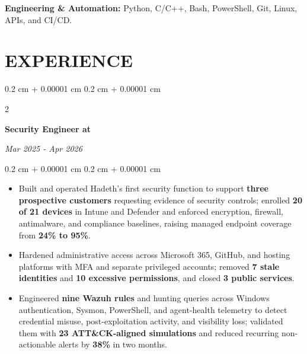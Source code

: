 \documentclass[11pt, letterpaper]{article}
\newenvironment{highlights}{
    \begin{itemize}[
        topsep=0.02 cm,
        parsep=0.02 cm,
        partopsep=0pt,
        itemsep=0pt,
        leftmargin=0.4 cm + 10pt
    ]
}{
    \end{itemize}
} %
\newenvironment{onecolentry}{
    \begin{adjustwidth}{
        0.2 cm + 0.00001 cm
    }{
        0.2 cm + 0.00001 cm
    }
}{
    \end{adjustwidth}
} %
\newenvironment{twocolentry}[2][]{
    \onecolentry
    \def\secondColumn{#2}
    \setcolumnwidth{\fill, 4.5 cm}
    \begin{paracol}{2}
}{
    \switchcolumn \raggedleft \secondColumn
    \end{paracol}
    \endonecolentry
} %
\let\hrefWithoutArrow\href
\renewcommand{\href}[2]{\hrefWithoutArrow{#1}{\ifthenelse{\equal{#2}{}}{ }{#2}}}
\begin{document}
    \textbf{Engineering \& Automation:} Python, C/C++, Bash, PowerShell, Git, Linux, APIs, and CI/CD.

    \vspace{-0.1cm}
    \section{EXPERIENCE}

    \vspace{0.05cm}
    \begin{twocolentry}{
        \textit{Mar 2025 - Apr 2026}}
        \textbf{Security Engineer at }
        \textit{\href{https://www.linkedin.com/company/hadeth-ca/}{Hadeth}}
    \end{twocolentry}

    \begin{onecolentry}
    \begin{highlights}

        \vspace{0.05cm}
        \item Built and operated Hadeth's first security function to support \textbf{three prospective customers} requesting evidence of security controls; enrolled \textbf{20 of 21 devices} in Intune and Defender and enforced encryption, firewall, antimalware, and compliance baselines, raising managed endpoint coverage from \textbf{24\% to 95\%}.
        \vspace{0.085cm}

        \item Hardened administrative access across Microsoft 365, GitHub, and hosting platforms with MFA and separate privileged accounts; removed \textbf{7 stale identities} and \textbf{10 excessive permissions}, and closed \textbf{3 public services}.
        \vspace{0.085cm}

        \item Engineered \textbf{nine Wazuh rules} and hunting queries across Windows authentication, Sysmon, PowerShell, and agent-health telemetry to detect credential misuse, post-exploitation activity, and visibility loss; validated them with \textbf{23 ATT\&CK-aligned simulations} and reduced recurring non-actionable alerts by \textbf{38\%} in two months.
        \vspace{0.085cm}


\end{highlights}
\end{onecolentry}
\end{document}
